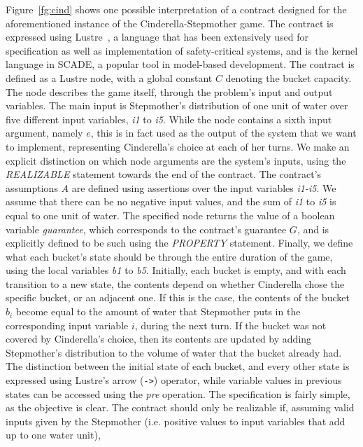Figure~\ref{fg:cind} shows one possible interpretation of a contract designed
for the aforementioned instance of the Cinderella-Stepmother game. The contract
is expressed using Lustre~\cite{lustrev6}, a language
that has been extensively used for specification as well as implementation of
safety-critical systems, and is the kernel language in SCADE, a popular tool in
model-based development. The contract is defined as a Lustre node, with a global
constant $C$ denoting the bucket capacity. The node describes the game itself,
through the problem's input and output variables. The main input is Stepmother's
distribution of one unit of water over five different input variables,
\textit{i1} to \textit{i5}. While the node contains a sixth input argument,
namely $e$, this is in fact used as the output of the system that we want to
implement, representing Cinderella's choice at each of her turns. We make an
explicit distinction on which node arguments are the system's inputs, using the \textit{REALIZABLE} statement towards the end of the contract. The contract's
assumptions $A$ are defined using assertions over the input variables
\textit{i1-i5}. We assume that there can be no negative input values, and the
sum of \textit{i1} to \textit{i5} is equal to one unit of water. The specified node
returns the value of a boolean variable \textit{guarantee}, which corresponds to
the contract's guarantee $G$, and is explicitly defined to be such using the
\textit{PROPERTY} statement.
Finally, we define what each bucket's state should be through the entire
duration of the game, using the local variables \textit{b1} to \textit{b5}.
Initially, each bucket is empty, and with each transition to a new state, the contents depend on
whether Cinderella chose the specific bucket, or an adjacent one. If this is the
case, the contents of the bucket $b_i$ become equal to the amount of water that
Stepmother puts in the corresponding input variable $i$, during the next turn.
If the bucket was not covered by Cinderella's choice, then its contents are
updated by adding Stepmother's distribution to the volume of water that the
bucket already had. The distinction between the initial state of each bucket,
and every other state is expressed using Lustre's arrow (\texttt{->})
operator, while variable values in previous states can be accessed using the
\textit{pre} operation.
The specification is fairly simple, as the objective is clear. The contract
should only be realizable if, assuming valid inputs given by the Stepmother
(i.e. positive values to input variables that add up to one water unit),
